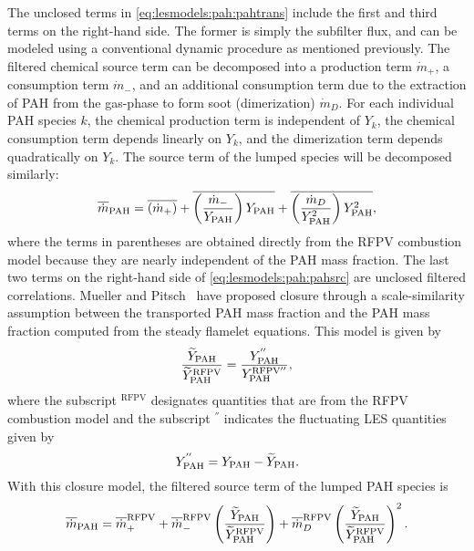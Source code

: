 The unclosed terms in \cref{eq:lesmodels:pah:pahtrans} include the first and third terms on the right-hand side. The former is simply the subfilter flux, and can be modeled using a conventional dynamic procedure as mentioned previously. The filtered chemical source term can be decomposed into a production term $\dot{m}_{+}$, a consumption term $\dot{m}_{-}$, and an additional consumption term due to the extraction of PAH from the gas-phase to form soot (dimerization) $\dot{m}_{D}$. For each individual PAH species $k$, the chemical production term is independent of $Y_k$, the chemical consumption term depends linearly on $Y_k$, and the dimerization term depends quadratically on $Y_k$. The source term of the lumped species will be decomposed similarly:
\begin{equation}\label{eq:lesmodels:pah:pahsrc}
  \fst[m]{\text{PAH}} = \mean{(\dot{m}_{+})} + \mean{\left( \frac{\dot{m}_{-}}{Y_{\text{PAH}}} \right) Y_{\text{PAH}}} + \mean{\left( \frac{\dot{m}_{D}}{Y_{\text{PAH}}^2} \right) Y_{\text{PAH}}^2},
\end{equation}
where the terms in parentheses are obtained directly from the RFPV combustion model because they are nearly independent of the PAH mass fraction. The last two terms on the right-hand side of \cref{eq:lesmodels:pah:pahsrc} are unclosed filtered correlations. Mueller and Pitsch~\cite{mueller2012} have proposed closure through a scale-similarity assumption between the transported PAH mass fraction and the PAH mass fraction computed from the steady flamelet equations. This model is given by
\begin{equation}\label{eq:lesmodels:pah:similarity}
  \frac{\tf{Y}_{\text{PAH}}}{\tf{Y}_{\text{PAH}}^{\text{RFPV}}} = \frac{Y_{\text{PAH}}^{''}}{Y_{\text{PAH}}^{\text{RFPV}''}},
\end{equation}
where the subscript $^{\text{RFPV}}$ designates quantities that are from the RFPV combustion model and the subscript $^{''}$ indicates the fluctuating LES quantities given by
\begin{equation}\label{eq:lesmodels:pah:residual}
  Y_{\text{PAH}}^{''} = Y_{\text{PAH}} - \tf{Y}_{\text{PAH}}.
\end{equation}
With this closure model, the filtered source term of the lumped PAH species is
\begin{equation}\label{eq:lesmodels:pah:pahsrcmodeled}
  \fst[m]{\text{PAH}} = \mean{\dot{m}}_{+}^{\text{RFPV}} + \mean{\dot{m}}_{-}^{\text{RFPV}}\left( \frac{\tf{Y}_{\text{PAH}}}{\tf{Y}_{\text{PAH}}^{\text{RFPV}}} \right) + \mean{\dot{m}}_{D}^{\text{RFPV}}\left( \frac{\tf{Y}_{\text{PAH}}}{\tf{Y}_{\text{PAH}}^{\text{RFPV}}} \right)^2.
\end{equation}
